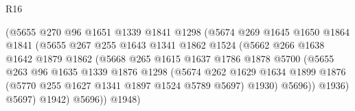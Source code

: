 \begin{lexlean}{R16}
\begin{coremodule}
                                  (@5655
                                    @270
                                    @96
                                    @1651
                                    @1339
                                    @1841
                                    @1298
                                    (@5674
                                      @269
                                      @1645
                                      @1650
                                      @1864
                                      @1841
                                      (@5655
                                        @267
                                        @255
                                        @1643
                                        @1341
                                        @1862
                                        @1524
                                        (@5662
                                          @266
                                          @1638
                                          @1642
                                          @1879
                                          @1862
                                          (@5668
                                            @265
                                            @1615
                                            @1637
                                            @1786
                                            @1878
                                            @5700
                                            (@5655
                                              @263
                                              @96
                                              @1635
                                              @1339
                                              @1876
                                              @1298
                                              (@5674
                                                @262
                                                @1629
                                                @1634
                                                @1899
                                                @1876
                                                (@5770 @255 @1627 @1341 @1897 @1524 @5789 @5697)
                                                @1930)
                                              @5696))
                                          @1936)
                                        @5697)
                                      @1942)
                                    @5696))
                                @1948)

\end{coremodule}
\end{lexlean}
